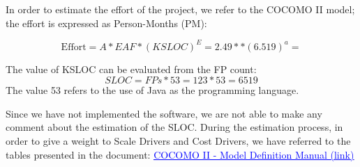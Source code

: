 In order to estimate the effort of the project, we refer to the COCOMO II model; the effort is expressed as Person-Months (PM):

\begin{equation}
    \textrm{Effort} = A * EAF * (KSLOC)^{E} = 2.49 *  * (6.519)^{a}  = 
\end{equation}


The value of KSLOC can be evaluated from the FP count:
\begin{equation}
    SLOC = FPs * 53 = 123 * 53 = 6519
\end{equation}
The value 53 refers to the use of Java as the programming language.

Since we have not implemented the software, we are not able to make any comment about the estimation of the SLOC. 
\newline 
During the estimation process, in order to give a weight to Scale Drivers and Cost Drivers, we have referred to the tables presented in the document: 
\newline
\href{http://csse.usc.edu/csse/research/COCOMOII/cocomo2000.0/CII_modelman2000.0.pdf}{\textcolor{blue}{\underline{COCOMO II - Model Definition Manual (link)}}}